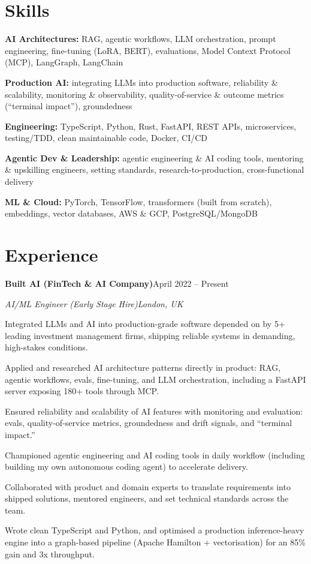 \documentclass[10pt,a4paper]{article}
\newcommand{\entry}[4]{%
  {\color{company}\bfseries #1}\hfill {\color{muted}#2}\par
  \vspace{1pt}
  {\itshape #3}\hfill {\color{muted}\itshape #4}\par
  \vspace{3pt}%
}
\begin{document}
\section{Skills}
\begin{tight}
  \item[\textcolor{accent}{\small$\bullet$}] \textbf{AI Architectures:} RAG, agentic workflows, LLM orchestration, prompt engineering, fine-tuning (LoRA, BERT), evaluations, Model Context Protocol (MCP), LangGraph, LangChain
  \item[\textcolor{accent}{\small$\bullet$}] \textbf{Production AI:} integrating LLMs into production software, reliability \& scalability, monitoring \& observability, quality-of-service \& outcome metrics (``terminal impact''), groundedness
  \item[\textcolor{accent}{\small$\bullet$}] \textbf{Engineering:} TypeScript, Python, Rust, FastAPI, REST APIs, microservices, testing/TDD, clean maintainable code, Docker, CI/CD
  \item[\textcolor{accent}{\small$\bullet$}] \textbf{Agentic Dev \& Leadership:} agentic engineering \& AI coding tools, mentoring \& upskilling engineers, setting standards, research-to-production, cross-functional delivery
  \item[\textcolor{accent}{\small$\bullet$}] \textbf{ML \& Cloud:} PyTorch, TensorFlow, transformers (built from scratch), embeddings, vector databases, AWS \& GCP, PostgreSQL/MongoDB
\end{tight}

\section{Experience}
\entry{Built AI (FinTech \& AI Company)}{April 2022 -- Present}{AI/ML Engineer (Early Stage Hire)}{London, UK}
\begin{tight}
  \item Integrated LLMs and AI into production-grade software depended on by 5+ leading investment management firms, shipping reliable systems in demanding, high-stakes conditions.
  \item Applied and researched AI architecture patterns directly in product: RAG, agentic workflows, evals, fine-tuning, and LLM orchestration, including a FastAPI server exposing 180+ tools through MCP.
  \item Ensured reliability and scalability of AI features with monitoring and evaluation: evals, quality-of-service metrics, groundedness and drift signals, and ``terminal impact.''
  \item Championed agentic engineering and AI coding tools in daily workflow (including building my own autonomous coding agent) to accelerate delivery.
  \item Collaborated with product and domain experts to translate requirements into shipped solutions, mentored engineers, and set technical standards across the team.
  \item Wrote clean TypeScript and Python, and optimised a production inference-heavy engine into a graph-based pipeline (Apache Hamilton + vectorisation) for an 85\% gain and 3x throughput.
\end{tight}
\end{document}
